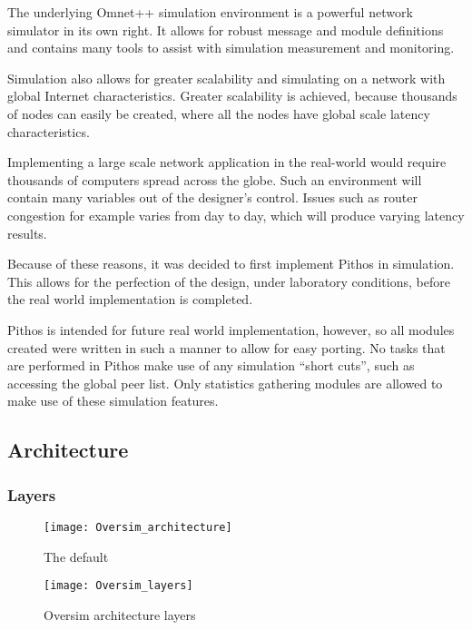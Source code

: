 The underlying Omnet++ simulation environment is a powerful network simulator in its own right. It allows for robust message and module definitions and contains many tools to assist with simulation measurement and monitoring.

Simulation also allows for greater scalability and simulating on a network with global Internet characteristics. Greater scalability is achieved, because thousands of nodes can easily be created, where all the nodes have global scale latency characteristics.

Implementing a large scale network application in the real-world would require thousands of computers spread across the globe. Such an environment will contain many variables out of the designer's control. Issues such as router congestion for example varies from day to day, which will produce varying latency results.

Because of these reasons, it was decided to first implement Pithos in simulation. This allows for the perfection of the design, under laboratory conditions, before the real world implementation is completed.

Pithos is intended for future real world implementation, however, so all modules created were written in such a manner to allow for easy porting. No tasks that are performed in Pithos make use of any simulation ``short cuts'', such as accessing the global peer list. Only statistics gathering modules are allowed to make use of these simulation features.


    \subsection{Architecture}

        \subsubsection{Layers}
        
\begin{figure}[htbp]
 \centering
 \texttt{[image: Oversim\_architecture]}
 \caption{The default}
 \label{fig_oversim_architecture}
\end{figure}

\begin{figure}[htbp]
 \centering
 \texttt{[image: Oversim\_layers]}
 \caption{Oversim architecture layers}
 \label{fig_oversim_layers}
\end{figure}

